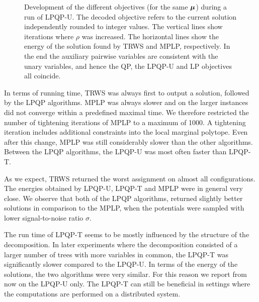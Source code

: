 \begin{figure}[htb]
    \centering
    \def\xmin{0}
    \def\xmax{1900}
    \def\ymax{-2000}
    \def\ymin{-4000}
    \def\outputfile{\dir/include/grid.csv}
    \def\outputfilerho{\dir/include/grid_rho.tikz.tex}
    \def\outputfiletrws{\dir/include/grid_trws.tikz.tex}
    \def\outputfilemplp{\dir/include/grid_mplp.tikz.tex}
    
    \caption[Example run of the LPQP algorithm]
    {Development of the different objectives (for the same
    $\bm{\mu}$) during a run of \acs{LPQP-U}.
    The decoded objective refers to the current
    solution independently rounded to integer values. The vertical lines show iterations
    where $\rho$ was increased. The horizontal lines show the energy of the
    solution found by \ac{TRWS} and \ac{MPLP}, respectively. In the end the
    auxiliary pairwise variables are consistent with the unary variables, and
    hence the \ac{QP}, the \ac{LPQP-U} and \ac{LP} objectives all coincide.}
    \label{fig:lpqp:grid}
\end{figure}
In terms of running time, \ac{TRWS} was always first to output a solution, 
followed by the \ac{LPQP} algorithms. \ac{MPLP} was always slower and on the larger instances
did not converge within a predefined maximal time. We therefore restricted the
number of tightening iterations of \ac{MPLP} to a maximum of 1000. A tightening
iteration includes additional constraints into the local marginal polytope. Even
after this change, \ac{MPLP} was still considerably slower than the other algorithms. 
Between the \ac{LPQP} algorithms, the \acs{LPQP-U} was most often faster than
\acs{LPQP-T}.

As we expect, \ac{TRWS} returned the worst assignment on almost all configurations.
The energies obtained by \acs{LPQP-U}, \acs{LPQP-T} and \ac{MPLP} were in general very close.
We observe that both of the \ac{LPQP} algorithms, returned slightly better solutions 
in comparison to the \ac{MPLP}, when the potentials were sampled with lower 
signal-to-noise ratio $\sigma$. 

The run time of \acs{LPQP-T} seems to be mostly influenced by the structure of 
the decomposition. In later experiments where the decomposition consisted of 
a larger number of trees with more variables in common, the \acs{LPQP-T} was 
significantly slower compared to the \acs{LPQP-U}. In terms of the energy of the 
solutions, the two algorithms were very similar. For this reason we report from 
now on the \acs{LPQP-U} only. The \acs{LPQP-T} can still be beneficial in settings where 
the computations are performed on a distributed system. 

